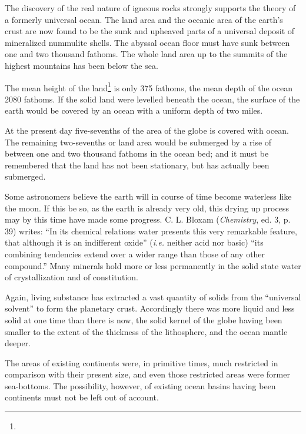 \documentclass[a4paper, 12pt, oneside]{article}
\begin{document}
The discovery of the real nature of igneous rocks strongly supports the theory of a formerly universal ocean. The land area and the oceanic area of the earth's crust are now found to be the sunk and upheaved parts of a universal deposit of mineralized nummulite shells. The abyssal ocean floor must have sunk between one and two thousand fathoms. The whole land area up to the summits of the highest mountains has been below the sea.

The mean height of the land\footnote{} is only 375 fathoms, the mean depth of the ocean 2080 fathoms. If the solid land were levelled beneath the ocean, the surface of the earth would be covered by an ocean with a uniform depth of two miles.

At the present day five-sevenths of the area of the globe is covered with ocean. The remaining two-sevenths or land area would be submerged by a rise of between one and two thousand fathoms in the ocean bed; and it must be remembered that the land has not been stationary, but has actually been submerged.

Some astronomers believe the earth will in course of time become waterless like the moon. If this be so, as the earth is already very old, this drying up process may by this time have made some progress. C. L. Bloxam (\emph{Chemistry}, ed. 3, p. 39) writes: ``In its chemical relations water presents this very remarkable feature, that although it is an indifferent oxide'' (\emph{i.e.} neither acid nor basic) ``its combining tendencies extend over a wider range than those of any other compound.'' Many minerals hold more or less permanently in the solid state water of crystallization and of constitution.

Again, living substance has extracted a vast quantity of solids from the ``universal solvent'' to form the planetary crust. Accordingly there was more liquid and less solid at one time than there is now, the solid kernel of the globe having been smaller to the extent of the thickness of the lithosphere, and the ocean mantle deeper.

The areas of existing continents were, in primitive times, much restricted in comparison with their present size, and even those restricted areas were former sea-bottoms. The possibility, however, of existing ocean basins having been continents must not be left out of account.
\end{document}
